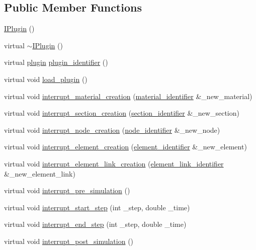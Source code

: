 \subsection*{Public Member Functions}
\begin{DoxyCompactItemize}
\item 
\hyperlink{classIPlugin_a5c43c107b8a3109755cc0e5a26fb5642}{I\-Plugin} ()
\item 
virtual \hyperlink{classIPlugin_a92763c9985354dc46cae781e3873a6b2}{$\sim$\-I\-Plugin} ()
\item 
virtual \hyperlink{plugins_8hh_af34747f68f9b0963dea6e8f3c659659c}{plugin} \hyperlink{classIPlugin_adcfd0fb076b3d72246d1dbdccecc69d6}{plugin\-\_\-identifier} ()
\item 
virtual void \hyperlink{classIPlugin_aec5e64955d7c36f033651ff4d93d6ebb}{load\-\_\-plugin} ()
\item 
virtual void \hyperlink{classIPlugin_ab5917f9b11793d640a5c386f8107033a}{interrupt\-\_\-material\-\_\-creation} (\hyperlink{structmaterial__identifier}{material\-\_\-identifier} \&\-\_\-new\-\_\-material)
\item 
virtual void \hyperlink{classIPlugin_ac247d76db1677abefface875defac756}{interrupt\-\_\-section\-\_\-creation} (\hyperlink{structsection__identifier}{section\-\_\-identifier} \&\-\_\-new\-\_\-section)
\item 
virtual void \hyperlink{classIPlugin_a100d2a3202e1117c81ba40da77421b9d}{interrupt\-\_\-node\-\_\-creation} (\hyperlink{structnode__identifier}{node\-\_\-identifier} \&\-\_\-new\-\_\-node)
\item 
virtual void \hyperlink{classIPlugin_ac0e36a76522f4d6e2fd33d82abb25770}{interrupt\-\_\-element\-\_\-creation} (\hyperlink{structelement__identifier}{element\-\_\-identifier} \&\-\_\-new\-\_\-element)
\item 
virtual void \hyperlink{classIPlugin_acea743d2a1b418d671d980418787ee3c}{interrupt\-\_\-element\-\_\-link\-\_\-creation} (\hyperlink{structelement__link__identifier}{element\-\_\-link\-\_\-identifier} \&\-\_\-new\-\_\-element\-\_\-link)
\item 
virtual void \hyperlink{classIPlugin_af3a42960590594e2623fc2592c925de3}{interrupt\-\_\-pre\-\_\-simulation} ()
\item 
virtual void \hyperlink{classIPlugin_ab6128940f6d722d57f26c61b56d2b213}{interrupt\-\_\-start\-\_\-step} (int \-\_\-step, double \-\_\-time)
\item 
virtual void \hyperlink{classIPlugin_ada2dcfc2d2b1a67b29fe75b30575fbe6}{interrupt\-\_\-end\-\_\-step} (int \-\_\-step, double \-\_\-time)
\item 
virtual void \hyperlink{classIPlugin_a8de731011e31780ece2990086db410a0}{interrupt\-\_\-post\-\_\-simulation} ()
\end{DoxyCompactItemize}
